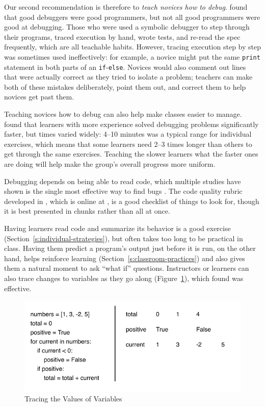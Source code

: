 Our second recommendation is therefore to \emph{teach novices how to debug}.
\cite{Fitz2008,Murp2008} found that good debuggers were good
programmers, but not all good programmers were good at debugging. Those
who were used a symbolic debugger to step through their programs, traced
execution by hand, wrote tests, and re-read the spec frequently, which
are all teachable habits. However, tracing execution step by step was
sometimes used ineffectively: for example, a novice might put the same
\texttt{print} statement in both parts of an \texttt{if}-\texttt{else}. Novices would also
comment out lines that were actually correct as they tried to isolate a
problem; teachers can make both of these mistakes deliberately, point
them out, and correct them to help novices get past them.

Teaching novices how to debug can also help make classes easier to
manage. \cite{Alqa2017} found that learners with more experience
solved debugging problems significantly faster, but times varied widely:
4--10 minutes was a typical range for individual exercises, which means
that some learners need 2--3 times longer than others to get through the
same exercises. Teaching the slower learners what the faster ones are
doing will help make the group's overall progress more uniform.

Debugging depends on being able to read code, which multiple studies
have shown is the single most effective way to find bugs
\cite{Basi1987,Keme2009,Bacc2013}. The code
quality rubric developed in \cite{Steg2014,Steg2016a},
which is online at \cite{Steg2016b}, is a good checklist of things
to look for, though it is best presented in chunks rather than all at
once.

Having learners read code and summarize its behavior is a good exercise
(Section~\ref{s:individual-strategies}), but often takes too long to be
practical in class. Having them predict a program's output just before
it is run, on the other hand, helps reinforce learning
(Section~\ref{s:classroom-practices}) and also gives them a natural
moment to ask ``what if'' questions. Instructors or learners can also
trace changes to variables as they go along (Figure~\ref{f:pck-sketch}),
which \cite{Cunn2017} found was effective.

\begin{figure}
\centering
\includegraphics{../../figures/sketching-variables.pdf}
\caption{Tracing the Values of Variables}
\label{f:pck-sketch}
\end{figure}

